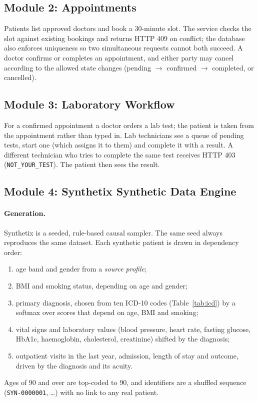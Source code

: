 \documentclass{tietreport}
\begin{document}
\subsection{Module 2: Appointments}

Patients list approved doctors and book a 30-minute slot. The service checks
the slot against existing bookings and returns HTTP 409 on conflict; the
database also enforces uniqueness so two simultaneous requests cannot both
succeed. A doctor confirms or completes an appointment, and either party may
cancel according to the allowed state changes (pending $\rightarrow$
confirmed $\rightarrow$ completed, or cancelled).

\subsection{Module 3: Laboratory Workflow}

For a confirmed appointment a doctor orders a lab test; the patient is taken
from the appointment rather than typed in. Lab technicians see a queue of
pending tests, start one (which assigns it to them) and complete it with a
result. A different technician who tries to complete the same test receives
HTTP 403 (\texttt{NOT\_YOUR\_TEST}). The patient then sees the result.

\subsection{Module 4: Synthetix Synthetic Data Engine}
\label{sec:synthetix}

\paragraph{Generation.} Synthetix is a seeded, rule-based causal sampler.
The same seed always reproduces the same dataset. Each synthetic patient is
drawn in dependency order:
\begin{enumerate}
  \item age band and gender from a \emph{source profile};
  \item BMI and smoking status, depending on age and gender;
  \item primary diagnosis, chosen from ten ICD-10 codes (Table~\ref{tab:icd})
    by a softmax over scores that depend on age, BMI and smoking;
  \item vital signs and laboratory values (blood pressure, heart rate,
    fasting glucose, HbA1c, haemoglobin, cholesterol, creatinine) shifted by
    the diagnosis;
  \item outpatient visits in the last year, admission, length of stay and
    outcome, driven by the diagnosis and its acuity.
\end{enumerate}
Ages of 90 and over are top-coded to 90, and identifiers are a shuffled
sequence (\texttt{SYN-0000001}, \dots) with no link to any real patient.
\end{document}
